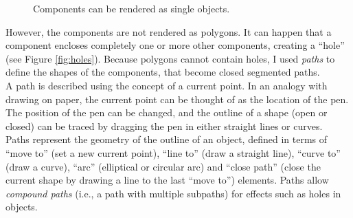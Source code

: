 \documentclass[]{usiinfbachelorproject}
\begin{document}
\begin{figure}[ht]
	\centering
	\caption{Components can be rendered as single objects.}
	\label{fig:polycomp}
\end{figure}

\noindent However, the components are not rendered as polygons. It can happen that a component encloses completely one or more other components, creating a ``hole'' (see Figure \ref{fig:holes}). Because polygons cannot contain holes, I used \emph{paths} to define the shapes of the components, that become closed segmented paths.\\
A path is described using the concept of a current point. In an analogy with drawing on paper, the current point can be thought of as the location of the pen. The position of the pen can be changed, and the outline of a shape (open or closed) can be traced by dragging the pen in either straight lines or curves.\\
Paths represent the geometry of the outline of an object, defined in terms of ``move to'' (set a new current point), ``line to'' (draw a straight line), ``curve to'' (draw a curve), ``arc'' (elliptical or circular arc) and ``close path'' (close the current shape by drawing a line to the last ``move to'') elements. Paths allow \emph{compound paths} (i.e., a path with multiple subpaths) for effects such as holes in objects.\\
\end{document}
